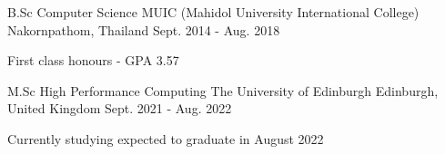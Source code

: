 

\begin{cventries}

  \cventry
    {B.Sc Computer Science} %
    {MUIC (Mahidol University International College)} %
    {Nakornpathom, Thailand} %
    {Sept. 2014 - Aug. 2018} %
    {
      \begin{cvitems} %
        \item {First class honours - GPA 3.57}
      \end{cvitems}
    }

  \cventry
    {M.Sc High Performance Computing} %
    {The University of Edinburgh} %
    {Edinburgh, United Kingdom} %
    {Sept. 2021 - Aug. 2022} %
    {
      \begin{cvitems} %
        \item {Currently studying expected to graduate in August 2022}
      \end{cvitems}
    }
    

\end{cventries}
